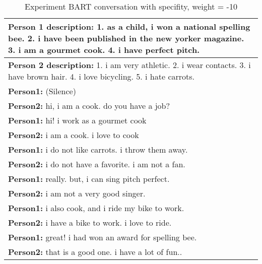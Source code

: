 \begin{table}[H]
\centering
 \begin{tabular}{|p{14cm}|} 
 \hline
 \textbf{Person 1 description:} 1. as a child, i won a national spelling bee. 2. i have been published in the new yorker magazine. 3. i am a gourmet cook. 4. i have perfect pitch. \\
 \hline
 \textbf{Person 2 description:} 1. i am very athletic. 2. i wear contacts. 3. i have brown hair. 4. i love bicycling. 5. i hate carrots. \\
 \hline
 \textbf{Person1:} (Silence) \\
 \textbf{Person2:} hi, i am a cook. do you have a job? \\ 
 \textbf{Person1:} hi! i work as a gourmet cook \\
 \textbf{Person2:} i am a cook. i love to cook \\
 \textbf{Person1:} i do not like carrots. i throw them away. \\
 \textbf{Person2:} i do not have a favorite. i am not a fan. \\
 \textbf{Person1:} really. but, i can sing pitch perfect. \\
 \textbf{Person2:} i am not a very good singer. \\
 \textbf{Person1:} i also cook, and i ride my bike to work. \\
 \textbf{Person2:} i have a bike to work. i love to ride. \\
 \textbf{Person1:} great! i had won an award for spelling bee. \\
 \textbf{Person2:} that is a good one. i have a lot of fun.. \\
 \hline
 \end{tabular}
 \caption{Experiment BART conversation with specifity, weight = -10}
\label{tab:bart_conversation_idf-10_ap}
\end{table}













